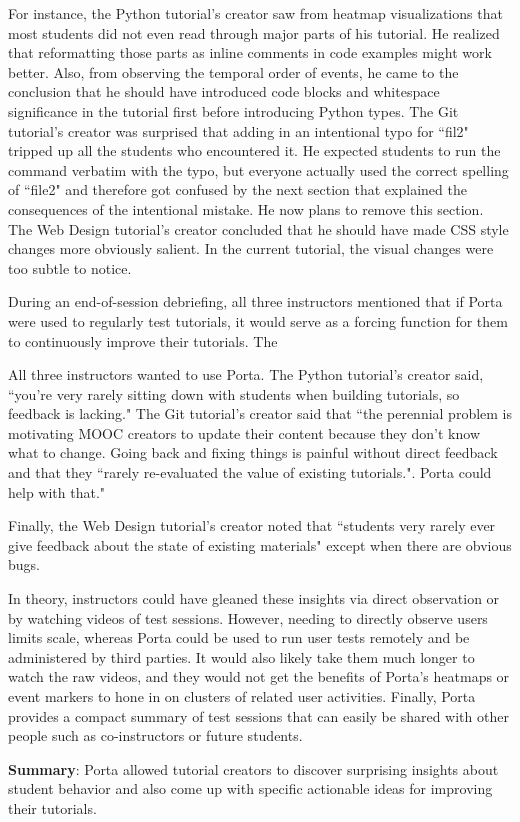 For instance, the Python tutorial's creator saw from heatmap
visualizations that most students did not even read through major parts
of his tutorial. He realized that reformatting those parts as inline
comments in code examples might work better. Also, from observing the
temporal order of events, he came to the conclusion that he should have
introduced code blocks and whitespace significance in the tutorial first
before introducing Python types.
%
The Git tutorial's creator was surprised that adding in an intentional
typo for ``fil2" tripped up all the students who encountered it. He
expected students to run the command verbatim with the typo, but
everyone actually used the correct spelling of ``file2" and therefore
got confused by the next section that explained the consequences of the
intentional mistake. He now plans to remove this section.
%
The Web Design tutorial's creator concluded that he should have made CSS
style changes more obviously salient. In the current tutorial, the
visual changes were too subtle to notice.

During an end-of-session debriefing, all three instructors mentioned
that if Porta were used to regularly test tutorials, it would serve as a
forcing function for them to continuously improve their tutorials. The

All three instructors wanted to use Porta. The Python tutorial's creator
said, ``you're very rarely sitting down with students when building
tutorials, so feedback is lacking." The Git tutorial's creator said that
``the perennial problem is motivating MOOC creators to update their
content because they don't know what to change. Going back and fixing
things is painful without direct feedback and that they ``rarely re-evaluated the value of existing tutorials.". Porta could help with that." 

Finally, the Web Design tutorial's creator noted that ``students very
rarely ever give feedback about the state of existing materials" except
when there are obvious bugs.

In theory, instructors could have gleaned these insights via direct
observation or by watching videos of test sessions. However, needing to
directly observe users limits scale, whereas Porta could be used to run
user tests remotely and be administered by third parties. It would also
likely take them much longer to watch the raw videos, and they would not
get the benefits of Porta's heatmaps or event markers to hone in on
clusters of related user activities. Finally, Porta provides a compact
summary of test sessions that can easily be shared with other people
such as co-instructors or future students.

\begin{mynote}

\textbf{Summary}: Porta allowed tutorial creators to discover surprising
insights about student behavior and also come up with specific
actionable ideas for improving their tutorials.

\end{mynote}
